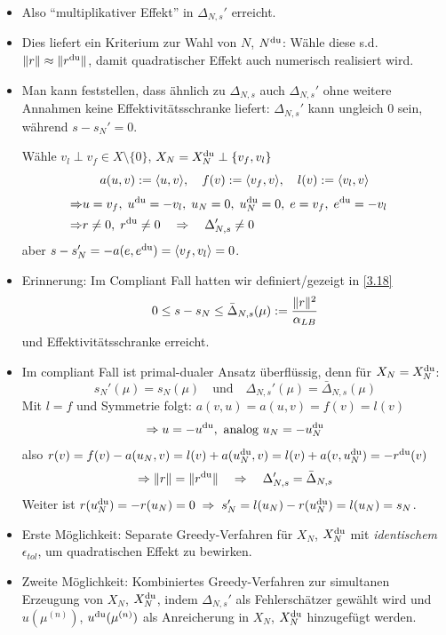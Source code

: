 \begin{bem} \beginwithlist
	\begin{itemize}
		\item Also ``multiplikativer Effekt'' in $\Delta_{N,s}'$ erreicht.
		\item Dies liefert ein Kriterium zur Wahl von $N$, $N^{\mathrm{du}}$:
			Wähle diese s.d.\ $\|r\| \approx \|r^{\mathrm{du}}\|$, damit quadratischer Effekt auch numerisch realisiert wird.
		\item Man kann feststellen, dass ähnlich zu $\Delta_{N,s}$ auch $\Delta_{N,s}'$ ohne weitere Annahmen keine Effektivitätsschranke liefert: $\Delta_{N,s}'$ kann ungleich $0$ sein, während $s-s_N'=0$.

			Wähle $v_l \perp v_f \in X \setminus \{0\}$, $X_N = X_N^{\mathrm{du}} \perp \{v_f,v_l\}$
			\[
				a(u,v) := \langle u, v \rangle, \quad f(v) := \langle v_f, v \rangle, \quad l(v) := \langle v_l, v \rangle
			\]
			\begin{align*}
				\Rightarrow& u = v_f, \; u^{\mathrm{du}} = -v_l, \; u_N = 0, \; u_N^{\mathrm{du}} = 0, \; e = v_f, \; e^{\mathrm{du}} = -v_l & \\
				\Rightarrow& r \neq 0, \; r^{\mathrm{du}} \neq 0 \quad \Rightarrow \quad \Delta_{N,s}' \neq 0
			\end{align*}
			aber $s-s_N'=-a(e,e^{\mathrm{du}})=\langle v_f, v_l \rangle=0$.
		\item Erinnerung:
			Im Compliant Fall hatten wir definiert/gezeigt in \ref{3.18}
			\[
				0 \leq s-s_N \leq \bar\Delta_{N,s}(\mu) := \frac{\|r\|^2}{\alpha_{LB}}
			\]
			und Effektivitätsschranke erreicht.
		\item Im compliant Fall ist primal-dualer Ansatz überflüssig, denn für $X_N = X_N^{\mathrm{du}}$:
			\[
				s_N'(\mu) = s_N(\mu) \quad \text{und} \quad \Delta_{N,s}'(\mu) = \bar\Delta_{N,s}(\mu)
			\]
			Mit $l=f$ und Symmetrie folgt: $a(v,u) = a(u,v) = f(v) = l(v)$
			\[
				\Rightarrow u = -u^{\mathrm{du}}, \text{ analog } u_N = -u_N^{\mathrm{du}}
			\]
			also $r(v) = f(v)-a(u_N,v) = l(v) + a(u_N^{\mathrm{du}},v) = l(v)+a(v,u_N^{\mathrm{du}}) = -r^{\mathrm{du}}(v)$
			\[
				\Rightarrow \|r\| = \|r^{\mathrm{du}}\| \quad \Rightarrow \quad \Delta_{N,s}' = \bar\Delta_{N,s}
			\]
			Weiter ist $r(u_N^{\mathrm{du}}) = -r(u_N) = 0 \; \Rightarrow \; s_N' = l(u_N)-r(u_N^{\mathrm{du}}) = l(u_N) = s_N$.
	\end{itemize}
\end{bem}

\begin{bem}[Basisgenerierung] \beginwithlistbem
	\begin{itemize}
		\item Erste Möglichkeit:
			Separate Greedy-Verfahren für $X_N$, $X_N^{\mathrm{du}}$ mit \emph{identischem} $\epsilon_{tol}$, um quadratischen Effekt zu bewirken.
		\item Zweite Möglichkeit:
			Kombiniertes Greedy-Verfahren zur simultanen Erzeugung von $X_N$, $X_N^{\mathrm{du}}$, indem $\Delta_{N,s}'$ als Fehlerschätzer gewählt wird und $u(\mu^{(n)})$, $u^{\mathrm{du}}(\mu^{(n)})$ als Anreicherung in $X_N$, $X_N^{\mathrm{du}}$ hinzugefügt werden.
	\end{itemize}
\end{bem}

